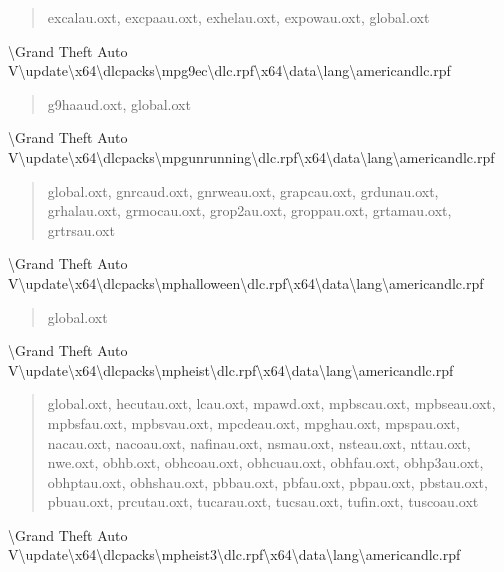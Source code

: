 \documentclass[]{scrartcl}
\begin{document}
\begin{quote}
   \ttfamily
   excalau.oxt, excpaau.oxt, exhelau.oxt, expowau.oxt, global.oxt
\end{quote}

\textbackslash{}Grand Theft Auto V\textbackslash{}update\textbackslash{}x64\textbackslash{}dlcpacks\textbackslash{}mpg9ec\textbackslash{}dlc.rpf\textbackslash{}x64\textbackslash{}data\textbackslash{}lang\textbackslash{}americandlc.rpf

\begin{quote}
   \ttfamily
   g9haaud.oxt, global.oxt
\end{quote}

\textbackslash{}Grand Theft Auto V\textbackslash{}update\textbackslash{}x64\textbackslash{}dlcpacks\textbackslash{}mpgunrunning\textbackslash{}dlc.rpf\textbackslash{}x64\textbackslash{}data\textbackslash{}lang\textbackslash{}americandlc.rpf

\begin{quote}
   \ttfamily
   global.oxt, gnrcaud.oxt, gnrweau.oxt, grapcau.oxt, grdunau.oxt, grhalau.oxt, grmocau.oxt, grop2au.oxt, groppau.oxt, grtamau.oxt, grtrsau.oxt
\end{quote}

\textbackslash{}Grand Theft Auto V\textbackslash{}update\textbackslash{}x64\textbackslash{}dlcpacks\textbackslash{}mphalloween\textbackslash{}dlc.rpf\textbackslash{}x64\textbackslash{}data\textbackslash{}lang\textbackslash{}americandlc.rpf

\begin{quote}
   \ttfamily
   global.oxt
\end{quote}

\textbackslash{}Grand Theft Auto V\textbackslash{}update\textbackslash{}x64\textbackslash{}dlcpacks\textbackslash{}mpheist\textbackslash{}dlc.rpf\textbackslash{}x64\textbackslash{}data\textbackslash{}lang\textbackslash{}americandlc.rpf

\begin{quote}
   \ttfamily
   global.oxt, hecutau.oxt, lcau.oxt, mpawd.oxt, mpbscau.oxt, mpbseau.oxt, mpbsfau.oxt, mpbsvau.oxt, mpcdeau.oxt, mpghau.oxt, mpspau.oxt, nacau.oxt, nacoau.oxt, nafinau.oxt, nsmau.oxt, nsteau.oxt, nttau.oxt, nwe.oxt, obhb.oxt, obhcoau.oxt, obhcuau.oxt, obhfau.oxt, obhp3au.oxt, obhptau.oxt, obhshau.oxt, pbbau.oxt, pbfau.oxt, pbpau.oxt, pbstau.oxt, pbuau.oxt, prcutau.oxt, tucarau.oxt, tucsau.oxt, tufin.oxt, tuscoau.oxt
\end{quote}

\textbackslash{}Grand Theft Auto V\textbackslash{}update\textbackslash{}x64\textbackslash{}dlcpacks\textbackslash{}mpheist3\textbackslash{}dlc.rpf\textbackslash{}x64\textbackslash{}data\textbackslash{}lang\textbackslash{}americandlc.rpf
\end{document}
